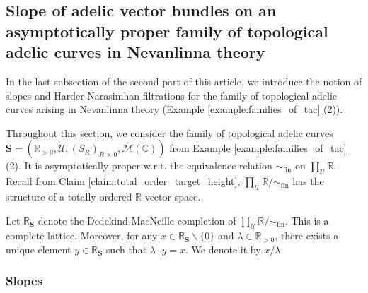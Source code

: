 \documentclass [11pt,reqno]{amsart}
\def\bC{{\mathbb{C}}}
\def\bR{{\mathbb{R}}}
\newcommand{\1}{\mathmybb{1}}
\def\cM{{\mathcal{M}}}
\def\cU{{\mathcal{U}}}
\def\fin{\mathrm{fin}}
\def\setminus{\smallsetminus}
\begin{document}

\subsection{Slope of adelic vector bundles on an asymptotically proper family of topological adelic curves in Nevanlinna theory}
\label{sub:slopes_adelic_vector_bundles_family_tac}

In the last subsection of the second part of this article, we introduce the notion of slopes and Harder-Narasimhan filtrations for the family of topological adelic curves arising in Nevanlinna theory (Example \ref{example:families_of_tac} (2)). 

Throughout this section, we consider the family of topological adelic curves $\mathbf{S}=(\bR_{>0},\cU,(S_{R})_{R>0},\cM(\bC))$ from Example \ref{example:families_of_tac} (2). It is asymptotically proper w.r.t. the equivalence relation $\sim_{\fin}$ on $\prod_{\cU}\bR$. Recall from Claim \ref{claim:total_order_target_height}, $\prod_{\cU}\bR/\sim_{\fin}$ has the structure of a totally ordered $\bR$-vector space. 

Let $\bR_{\mathbf{S}}$ denote the Dedekind-MacNeille completion of $\prod_{\cU}\bR/\sim_{\fin}$. This is a complete lattice. Moreover, for any $x\in \bR_{\mathbf{S}}\setminus\{0\}$ and $\lambda\in \bR_{>0}$, there exists a unique element $y\in \bR_{\mathbf{S}}$ such that $\lambda\cdot y=x$. We denote it by $x/\lambda$. 

\subsubsection{Slopes}
\end{document}
